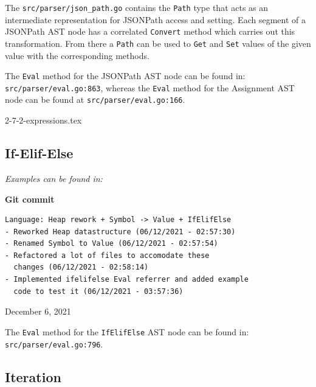 \documentclass[]{full}
\theoremstyle{definition}
\begin{document}
The \verb|src/parser/json_path.go| contains the \verb|Path| type that acts as an intermediate representation for JSONPath access and setting. Each segment of a JSONPath AST node has a correlated \verb|Convert| method which carries out this transformation. From there a \verb|Path| can be used to \verb|Get| and \verb|Set| values of the given value with the corresponding methods.

The \verb|Eval| method for the JSONPath AST node can be found in: \verb|src/parser/eval.go:863|, whereas the \verb|Eval| method for the Assignment AST node can be found at \verb|src/parser/eval.go:166|.

{2-7-2-expressions.tex}

\subsection{If-Elif-Else}

\textit{Examples can be found in: }

\begin{center}
    \textbf{Git commit}
    \begin{verbatim}
Language: Heap rework + Symbol -> Value + IfElifElse
- Reworked Heap datastructure (06/12/2021 - 02:57:30)
- Renamed Symbol to Value (06/12/2021 - 02:57:54)
- Refactored a lot of files to accomodate these 
  changes (06/12/2021 - 02:58:14)
- Implemented ifelifelse Eval referrer and added example
  code to test it (06/12/2021 - 03:57:36)
    \end{verbatim}
    \vspace{-1em}
    \tiny{December 6, 2021}
\end{center}

The \verb|Eval| method for the \verb|IfElifElse| AST node can be found in: \verb|src/parser/eval.go:796|.

\subsection{Iteration}
\end{document}
